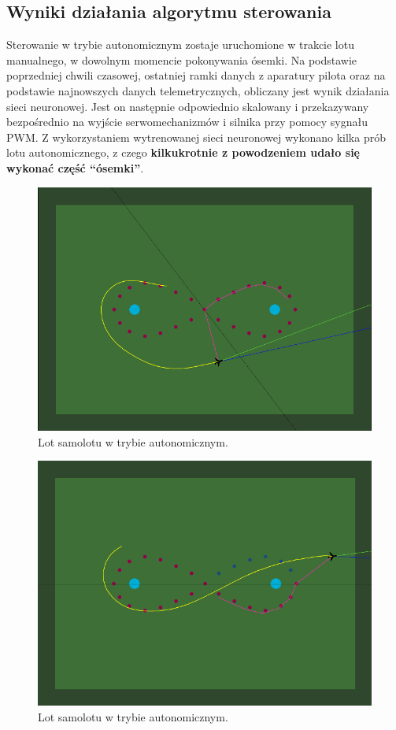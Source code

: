 \documentclass[12pt, a4paper]{article}
\begin{document}
\subsection{Wyniki działania algorytmu sterowania}
Sterowanie w trybie autonomicznym zostaje uruchomione w trakcie lotu manualnego, w dowolnym momencie pokonywania ósemki. Na podstawie poprzedniej chwili czasowej, ostatniej ramki danych z aparatury pilota oraz na podstawie najnowszych danych telemetrycznych, obliczany jest wynik działania sieci neuronowej. Jest on następnie odpowiednio skalowany i przekazywany bezpośrednio na wyjście serwomechanizmów i silnika przy pomocy sygnału PWM. Z wykorzystaniem wytrenowanej sieci neuronowej wykonano kilka prób lotu autonomicznego, z czego \textbf{kilkukrotnie z powodzeniem udało się wykonać część ``ósemki''}. 

 \begin{figure}[H]
    \centering
    \includegraphics[width=1\textwidth]{aileci1}
    \caption{Lot samolotu w trybie autonomicznym.}
    \label{fig:leci1}
\end{figure}

 \begin{figure}[H]
    \centering
    \includegraphics[width=1\textwidth]{aileci2}
    \caption{Lot samolotu w trybie autonomicznym.}
    \label{fig:leci2}
\end{figure}
\end{document}
